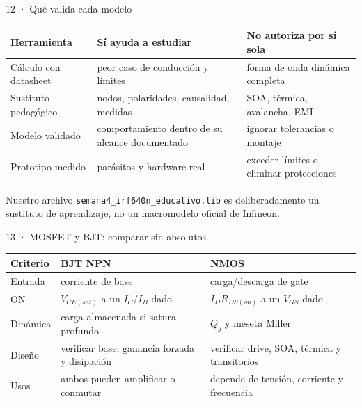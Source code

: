 \documentclass[aspectratio=169]{beamer}
\begin{document}
\begin{frame}{12 · Qué valida cada modelo}
  \small
  \begin{tabular}{p{}p{}p{}}
    \toprule
    Herramienta & Sí ayuda a estudiar & No autoriza por sí sola \\
    \midrule
    Cálculo con datasheet & peor caso de conducción y límites & forma de onda dinámica completa \\
    Sustituto pedagógico & nodos, polaridades, causalidad, medidas & SOA, térmica, avalancha, EMI \\
    Modelo validado & comportamiento dentro de su alcance documentado & ignorar tolerancias o montaje \\
    Prototipo medido & parásitos y hardware real & exceder límites o eliminar protecciones \\
    \bottomrule
  \end{tabular}
  \begin{block}{Nuestro archivo}
    \texttt{semana4\_irf640n\_educativo.lib} es deliberadamente un sustituto
    de aprendizaje, no un macromodelo oficial de Infineon.
  \end{block}
\end{frame}

\begin{frame}{13 · MOSFET y BJT: comparar sin absolutos}
  \small
  \begin{tabular}{p{}p{}p{}}
    \toprule
    Criterio & BJT NPN & NMOS \\
    \midrule
    Entrada & corriente de base & carga/descarga de gate \\
    ON & $V_{CE(sat)}$ a un $I_C/I_B$ dado & $I_D R_{DS(on)}$ a un $V_{GS}$ dado \\
    Dinámica & carga almacenada si satura profundo & $Q_g$ y meseta Miller \\
    Diseño & verificar base, ganancia forzada y disipación & verificar drive, SOA, térmica y transitorios \\
    Usos & ambos pueden amplificar o conmutar & depende de tensión, corriente y frecuencia \\
    \bottomrule
  \end{tabular}
\end{frame}
\end{document}
